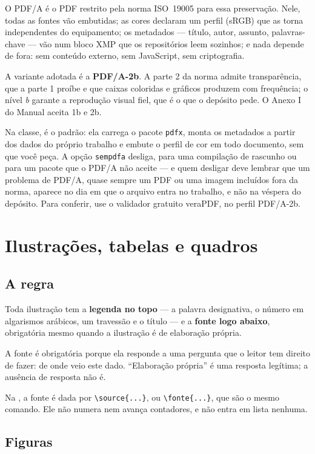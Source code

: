 \documentclass[dsc]{ufrj}
\begin{document}
  O PDF/A é o PDF restrito pela norma ISO~19005 para essa preservação. Nele,
  todas as fontes vão embutidas; as cores declaram um perfil (sRGB) que as torna
  independentes do equipamento; os metadados --- título, autor, assunto,
  palavras-chave --- vão num bloco XMP que os repositórios leem sozinhos; e nada
  depende de fora: sem conteúdo externo, sem JavaScript, sem criptografia.

  A variante adotada é a \textbf{PDF/A-2b}. A parte 2 da norma admite
  transparência, que a parte 1 proíbe e que caixas coloridas e gráficos
  produzem com frequência; o nível \emph{b} garante a reprodução visual fiel,
  que é o que o depósito pede. O Anexo I do Manual aceita 1b e 2b.

  Na classe, é o padrão: ela carrega o pacote \verb|pdfx|, monta os metadados a
  partir dos dados do próprio trabalho e embute o perfil de cor em todo
  documento, sem que você peça. A opção \verb|sempdfa| desliga, para uma
  compilação de rascunho ou para um pacote que o PDF/A não aceite --- e quem
  desligar deve lembrar que um problema de PDF/A, quase sempre um PDF ou uma
  imagem incluídos fora da norma, aparece no dia em que o arquivo entra no
  trabalho, e não na véspera do depósito. Para conferir, use o validador
  gratuito veraPDF, no perfil PDF/A-2b.

  \chapter{Ilustrações, tabelas e quadros}

  \section{A regra}

  Toda ilustração tem a \textbf{legenda no topo} --- a palavra designativa, o
  número em algarismos arábicos, um travessão e o título --- e a \textbf{fonte
  logo abaixo}, obrigatória mesmo quando a ilustração é de elaboração própria.

  A fonte é obrigatória porque ela responde a uma pergunta que o leitor tem
  direito de fazer: de onde veio este dado. ``Elaboração própria'' é uma resposta
  legítima; a ausência de resposta não é.

  Na \CoppeTeX, a fonte é dada por \verb|\source{...}|, ou \verb|\fonte{...}|,
  que são o mesmo comando. Ele não numera nem avança contadores, e não entra em
  lista nenhuma.

  \section{Figuras}
\end{document}
